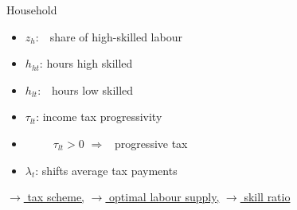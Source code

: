 \documentclass[11pt,aspectratio=169]{beamer}
\newcommand{\ar}{$\Rightarrow$ \ }
\begin{document}
\begin{frame}{Household}
\small
\vspace{4mm}
\begin{minipage}[t!]{0.4\textwidth}
	\vspace{7mm}
	\begin{itemize}
		\item[] $z_h$:\ \ share of high-skilled labour \vspace{-2mm}
		\item[] $h_{ht}$: hours high skilled\vspace{-2mm}
		\item[] $h_{lt}$:\ \ hours low skilled\vspace{-2mm}
	\end{itemize}
\end{minipage}
\begin{minipage}[t!]{0.5\textwidth}
	\vspace{8mm}
	\begin{itemize}
		\item[] $\tau_{lt}$: income tax progressivity \vspace{-2mm}
		\item[] \ \ \ \ \  $\tau_{lt}>0$ \ar progressive tax
		\vspace{-2mm}	
		\item[] $\lambda_{t}$: shifts average tax payments
	\end{itemize}
\end{minipage}


\vspace{4mm}
\hfill
\hyperlink{taxsc}{\tiny{$\rightarrow$ tax scheme,}} \hyperlink{opth}{\tiny{$\rightarrow$ optimal labour supply,}} 
\hyperlink{skillr}{\tiny{$\rightarrow$ skill ratio}}
\end{frame}
\end{document}
